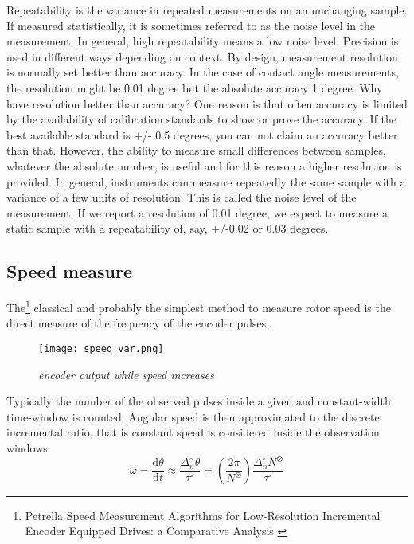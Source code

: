 Repeatability is the variance in repeated measurements on an unchanging sample. If measured statistically, it is sometimes referred to as the noise level in the measurement. In general, high repeatability means a low noise level. Precision is used in different ways depending on context.
By design, measurement resolution is normally set better than accuracy. In the case of contact angle measurements, the resolution might be 0.01 degree but the absolute accuracy 1 degree. Why have resolution better than accuracy? One reason is that often accuracy is limited by the availability of calibration standards to show or prove the accuracy. If the best available standard is +/- 0.5 degrees, you can not claim an accuracy better than that. However, the ability to measure small differences between samples, whatever the absolute number, is useful and for this reason a higher resolution is provided. In general, instruments can measure repeatedly the same sample with a variance of a few units of resolution. This is called the noise level of the measurement. If we report a resolution of 0.01 degree, we expect to measure a static sample with a repeatability of, say, +/-0.02 or 0.03 degrees. 

\subsection{Speed measure}
The\footnote{Petrella Speed Measurement Algorithms for Low-Resolution Incremental Encoder Equipped Drives: a Comparative Analysis \cite{petrella}} classical and probably the simplest method to measure rotor speed is the direct measure of the frequency of the encoder pulses. 

\begin{figure}[ht!]
\centerline{
\texttt{[image: speed\_var.png]}
}
\caption{\emph{encoder output while speed increases}}
\label {fig:v-var}
\end{figure}
Typically the number of the observed pulses inside a given and constant-width time-window is counted. Angular speed is then approximated to the discrete incremental ratio, that is constant speed is considered inside the observation windows:
\begin{equation}
\omega=\frac{\mathrm{d}\theta}{\mathrm{d}t}\approx\frac{\Delta_{n}^\circ\theta}{\tau^\circ}=\left(\frac{2\pi}{N^\otimes }\right) \frac{\Delta_n^\circ N^\otimes}{\tau^\circ}
\end{equation}

